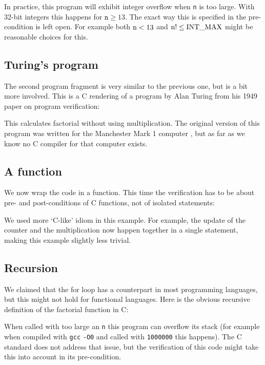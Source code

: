\documentclass{article}
\begin{document}
In practice, this program will exhibit integer overflow when \texttt{n} is too large.
With 32-bit integers this happens for $\texttt{n}\ge 13$.
The exact way this is specified in the pre-condition is left open.
For example both $\mbox{\lstinline{n}} < 13$ and $\mbox{\lstinline{n}}! \le \mbox{\lstinline{INT_MAX}}$
might be reasonable choices for this.

\subsection{Turing's program}
The second program fragment is very similar to the previous one, but is a bit more involved.
This is a C rendering of a program by Alan Turing from his 1949 paper \cite{tur:49}
on program verification:

This calculates factorial without using multiplication.
The original version of this program was written for the Manchester Mark 1 computer \cite{wie:16}, but as far as we know no C compiler for that computer exists.

\subsection{A function}
We now wrap the code in a function.
This time the verification has to be about pre- and post-conditions
of C functions, not of isolated statements:

We used more `C-like' idiom in this example.
For example, the update of the counter and the multiplication now
happen together in a single statement, making this example slightly less trivial.

\subsection{Recursion}
We claimed that the for loop has a counterpart in most programming languages,
but this might not hold for functional languages.
Here is the obvious recursive definition of the factorial function in C:

When called with too large an \texttt{n}
this program can overflow its stack
(for example when compiled with \texttt{gcc} \texttt{-O0} and called with
\texttt{1000000} this happens).
The C standard does not address that issue, but the verification of this
code might take this into account in its pre-condition.
\end{document}
